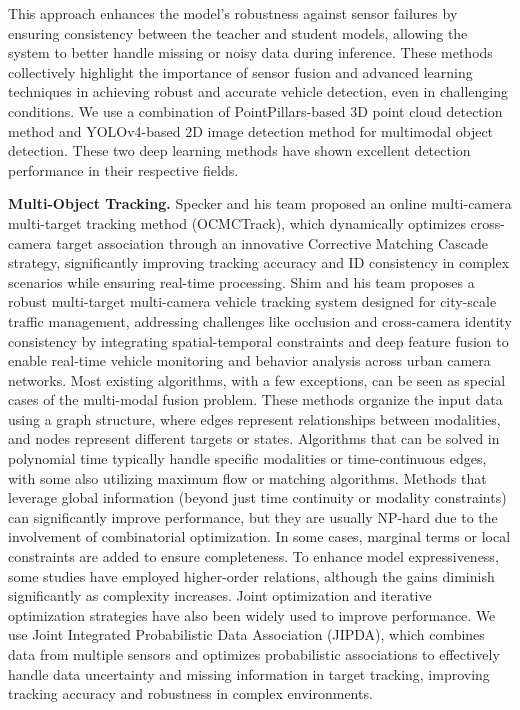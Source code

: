 \documentclass[lettersize,journal]{IEEEtran}
\begin{document}
This approach enhances the model’s robustness against sensor failures by ensuring consistency between the teacher and student models, allowing the system to better handle missing or noisy data during inference.
These methods collectively highlight the importance of sensor fusion and advanced learning techniques in achieving robust and accurate vehicle detection, even in challenging conditions.
We use a combination of PointPillars-based 3D point cloud detection method and YOLOv4-based 2D image detection method for multimodal object detection.
These two deep learning methods have shown excellent detection performance in their respective fields.

\textbf{Multi-Object Tracking.}
Specker and his team proposed an online multi-camera multi-target tracking method (OCMCTrack), which dynamically optimizes cross-camera target association through an innovative Corrective Matching Cascade strategy, significantly improving tracking accuracy and ID consistency in complex scenarios while ensuring real-time processing\cite{Alpher24e}.
Shim and his team proposes a robust multi-target multi-camera vehicle tracking system designed for city-scale traffic management, addressing challenges like occlusion and cross-camera identity consistency by integrating spatial-temporal constraints and deep feature fusion to enable real-time vehicle monitoring and behavior analysis across urban camera networks\cite{Alpher21e}.
Most existing algorithms, with a few exceptions, can be seen as special cases of the multi-modal fusion problem. 
These methods organize the input data using a graph structure, where edges represent relationships between modalities, and nodes represent different targets or states. 
Algorithms that can be solved in polynomial time typically handle specific modalities or time-continuous edges, with some also utilizing maximum flow or matching algorithms. 
Methods that leverage global information (beyond just time continuity or modality constraints) can significantly improve performance, but they are usually NP-hard due to the involvement of combinatorial optimization. 
In some cases, marginal terms or local constraints are added to ensure completeness. 
To enhance model expressiveness, some studies have employed higher-order relations, although the gains diminish significantly as complexity increases. 
Joint optimization and iterative optimization strategies have also been widely used to improve performance.
We use Joint Integrated Probabilistic Data Association (JIPDA), which combines data from multiple sensors and optimizes probabilistic associations to effectively handle data uncertainty and missing information in target tracking, improving tracking accuracy and robustness in complex environments.
\end{document}
